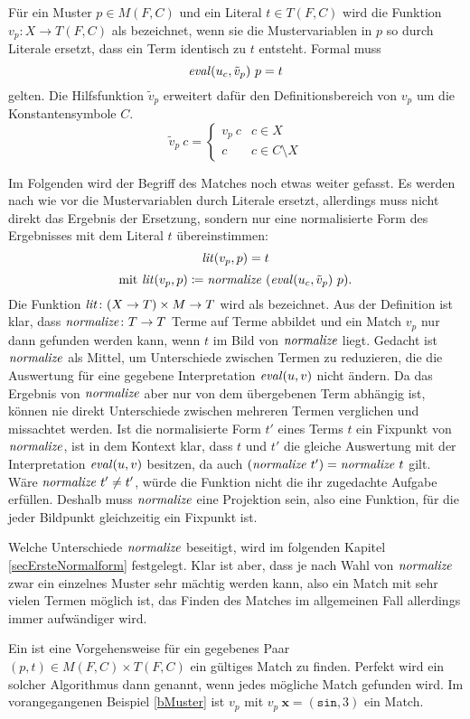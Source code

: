\begin{definition} \label{defMatch}
Für ein Muster $p \in M(F, C)$ und ein Literal $t \in T(F, C)$ wird die Funktion $v_p \colon X \rightarrow T(F, C)$ als  bezeichnet, wenn sie die Mustervariablen in $p$ so durch Literale ersetzt, dass ein Term identisch zu $t$ entsteht. Formal muss 
$$\mathit{eval}(u_c, \tilde v_p)~ p = t$$
gelten. Die Hilfsfunktion $\tilde v_p$ erweitert dafür den Definitionsbereich von $v_p$ um die Konstantensymbole $C$.
$$\tilde v_p~ c = \begin{cases}
	v_p~ c & c \in X\\
	c      & c \in C \setminus X
\end{cases}$$

Im Folgenden wird der Begriff des Matches noch etwas weiter gefasst. Es werden nach wie vor die Mustervariablen durch Literale ersetzt, allerdings muss nicht direkt das Ergebnis der Ersetzung, sondern nur eine normalisierte Form des Ergebnisses mit dem Literal $t$ übereinstimmen:
$$\mathit{lit}(v_p, p)  = t$$
$$\text{mit~}\mathit{lit}(v_p, p) \coloneqq \mathit{normalize}~(\mathit{eval}(u_c, \tilde v_p)~ p).$$
Die Funktion $\Const{lit} \colon \paren*{X \rightarrow T} \times M \rightarrow T$ wird als  bezeichnet.
Aus der Definition ist klar, dass $\mathit{normalize} \colon T \rightarrow T$ Terme auf Terme abbildet und ein Match $v_p$ nur dann gefunden werden kann, wenn $t$ im Bild von $\mathit{normalize}$ liegt. 
Gedacht ist $\mathit{normalize}$ als Mittel, um Unterschiede zwischen Termen zu reduzieren, die die Auswertung für eine gegebene Interpretation $\mathit{eval}(u, v)$ nicht ändern. Da das Ergebnis von $\mathit{normalize}$ aber nur von dem übergebenen Term abhängig ist, können nie direkt Unterschiede zwischen mehreren Termen verglichen und missachtet werden. Ist die normalisierte Form $t'$ eines Terms $t$ ein Fixpunkt von $\mathit{normalize}$, ist in dem Kontext klar, dass $t$ und $t'$ die gleiche Auswertung mit der Interpretation $\mathit{eval}(u, v)$ besitzen, da auch $(\mathit{normalize}~t') = \mathit{normalize}~t$ gilt. Wäre $\mathit{normalize}~t' \neq t'$, würde die Funktion nicht die ihr zugedachte Aufgabe erfüllen. Deshalb muss $\mathit{normalize}$ eine Projektion sein, also eine Funktion, für die jeder Bildpunkt gleichzeitig ein Fixpunkt ist. 

Welche Unterschiede $\mathit{normalize}$ beseitigt, wird im folgenden Kapitel \ref{secErsteNormalform} festgelegt. Klar ist aber, dass je nach Wahl von $\mathit{normalize}$ zwar ein einzelnes Muster sehr mächtig werden kann, also ein Match mit sehr vielen Termen möglich ist, das Finden des Matches im allgemeinen Fall allerdings immer aufwändiger wird. 
\end{definition}

Ein  ist eine Vorgehensweise für ein gegebenes Paar {$(p, t) \in M(F, C) \times T(F, C)$} ein gültiges Match zu finden. Perfekt wird ein solcher Algorithmus dann genannt, wenn jedes mögliche Match gefunden wird.
Im vorangegangenen Beispiel \ref{bMuster} ist $v_p$ mit $v_p~ \mathbf x = (\texttt{sin}, 3)$ ein Match.


